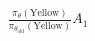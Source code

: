 \documentclass[preview]{standalone}
\begin{document}
\begin{align*}
\frac{\pi_\theta(\text{Yellow})}{\pi_{\theta_{\text{old}}}(\text{Yellow})} A_1
\end{align*}
\end{document}

